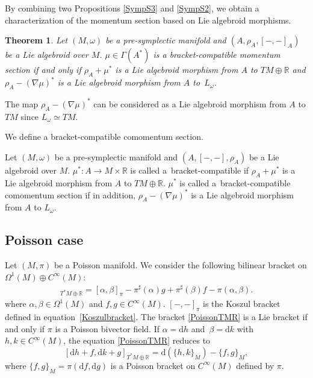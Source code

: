 \documentclass[10pt,a4paper]{amsart}
\numberwithin{equation}{section}
\newtheorem{Theorem}{Theorem}[section]
\def\bR{{\mathbb{R}}}
\newcommand{\sbv}[2]{{\{{{#1},{#2}}\}}}
\newcommand{\rhoa}{{\rho_A}}
\newcommand{\rd}{\mathrm{d}}
\begin{document}
By combining two Propositions \ref{SympS3} and \ref{SympS2}, we obtain a characterization of the momentum section based on Lie algebroid morphisms.
\begin{Theorem}
Let $(M, \omega)$ be a pre-symplectic manifold and $(A, \rhoa, [-,-]_A)$ be a Lie algebroid over $M$.
$\mu \in \Gamma(A^*)$ is a bracket-compatible momentum section
if and only if $\rhoa + \mu^*$ is a Lie algebroid morphism from
$A$ to $TM \oplus \bR$ and
$\rhoa - (\nabla \mu)^*$ is a Lie algebroid morphism
from $A$ to~$L_{\omega}$.
\end{Theorem}
The map $\rhoa - (\nabla \mu)^*$ can be considered as a Lie algebroid morphism from $A$ to $TM$ since $L_{\omega} \simeq TM$.

We define a bracket-compatible comomentum section.
\begin{Definition}\label{comomSymp}
Let $(M, \omega)$ be a pre-symplectic manifold
and $(A, [-,-], \rhoa)$ be a Lie algebroid over $M$.
$\mu^*\colon A \rightarrow M \times \bR$ is called a~bracket-compatible
if $\rhoa + \mu^*$ is a Lie algebroid morphism from
$A$ to $TM \oplus \bR$.
$\mu^*$ is called a~bracket-compatible comomentum section if in addition,
$\rhoa - (\nabla \mu)^*$ is a Lie algebroid morphism
from $A$ to $L_{\omega}$.
\end{Definition}

\subsection{Poisson case}\label{PoisLAM}

Let $(M, \pi)$ be a Poisson manifold.
We consider the following bilinear bracket on
$\Omega^1(M) \oplus C^{\infty}(M)$:
\begin{gather}
[\alpha + f, \beta + g]_{T^*M \oplus \bR} =
[\alpha, \beta]_{\pi} - \pi^{\sharp}(\alpha) g
+ \pi^{\sharp}(\beta) f - \pi(\alpha, \beta).
\label{PoissonTMR}
\end{gather}
where $\alpha, \beta \in \Omega^1(M)$ and $f, g \in C^{\infty}(M)$.
$[-,-]_{\pi}$ is the Koszul bracket defined in equation~\eqref{Koszulbracket}.
The bracket \eqref{PoissonTMR} is a Lie bracket if and only if $\pi$ is a Poisson bivector field.
If $\alpha = \rd h$ and~${\beta = \rd k}$ with $h, k \in C^{\infty}(M)$,
the equation \eqref{PoissonTMR} reduces to
\[%
[\rd h + f, \rd k + g]_{T^*M \oplus \bR} =
\rd (\sbv{h}{k}_{M}) - \sbv{f}{g}_{M},
\]
where $\sbv{f}{g}_{M} = \pi(\rd f, \rd g)$ is a Poisson bracket on $C^{\infty}(M)$ defined by $\pi$.
\end{document}
